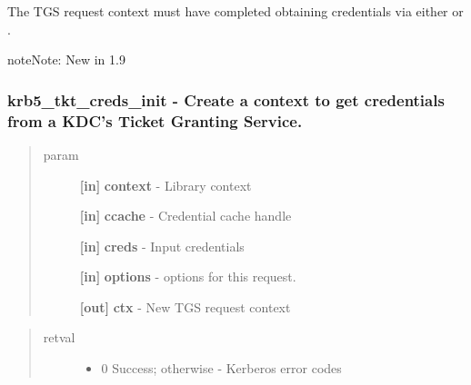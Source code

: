\documentclass[letterpaper,10pt,english]{sphinxmanual}
\begin{document}
The TGS request context must have completed obtaining credentials via either {\hyperref[appdev/refs/api/krb5_tkt_creds_get:krb5_tkt_creds_get]{}} or {\hyperref[appdev/refs/api/krb5_tkt_creds_step:krb5_tkt_creds_step]{}} .

\begin{notice}{note}{Note:}
New in 1.9
\end{notice}


\subsubsection{krb5\_tkt\_creds\_init -  Create a context to get credentials from a KDC's Ticket Granting Service.}
\label{appdev/refs/api/krb5_tkt_creds_init:krb5-tkt-creds-init-create-a-context-to-get-credentials-from-a-kdc-s-ticket-granting-service}\label{appdev/refs/api/krb5_tkt_creds_init::doc}

\begin{fulllineitems}
\label{appdev/refs/api/krb5_tkt_creds_init:krb5_tkt_creds_init}
\end{fulllineitems}

\begin{quote}\begin{description}
\item[{param}] \leavevmode
\textbf{{[}in{]}} \textbf{context} - Library context

\textbf{{[}in{]}} \textbf{ccache} - Credential cache handle

\textbf{{[}in{]}} \textbf{creds} - Input credentials

\textbf{{[}in{]}} \textbf{options} -  options for this request.

\textbf{{[}out{]}} \textbf{ctx} - New TGS request context

\end{description}\end{quote}
\begin{quote}\begin{description}
\item[{retval}] \leavevmode\begin{itemize}
\item {} 
0   Success; otherwise - Kerberos error codes

\end{itemize}

\end{description}\end{quote}
\end{document}

